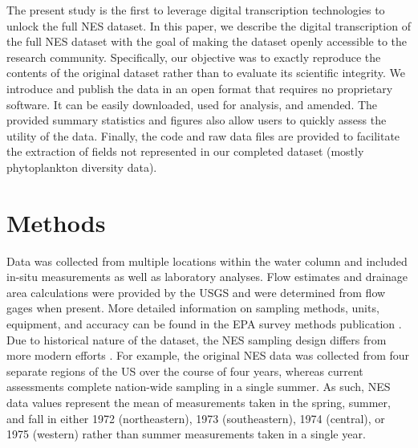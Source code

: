 \documentclass[journal abbreviations, manuscript]{copernicus}
\begin{document}
The present study is the first to leverage digital transcription technologies to unlock the full NES dataset. In this paper, we describe the digital transcription of the full NES dataset with the goal of making the dataset openly accessible to the research community. Specifically, our objective was to exactly reproduce the contents of the original dataset rather than to evaluate its scientific integrity. We introduce and publish the data in an open format that requires no proprietary software. It can be easily downloaded, used for analysis, and amended. The provided summary statistics and figures also allow users to quickly assess the utility of the data. Finally, the code and raw data files are provided to facilitate the extraction of fields not represented in our completed dataset (mostly phytoplankton diversity data).

\section{Methods}

Data was collected from multiple locations within the water column and included in-situ measurements as well as laboratory analyses. Flow estimates and drainage area calculations were provided by the USGS and were determined from flow gages when present. More detailed information on sampling methods, units, equipment, and accuracy can be found in the EPA survey methods publication \citep{nes-methods}. Due to historical nature of the dataset, the NES sampling design differs from more modern efforts \citep{nla-methods}. For example, the original NES data was collected from four separate regions of the US over the course of four years, whereas current assessments complete nation-wide sampling in a single summer. As such, NES data values represent the mean of measurements taken in the spring, summer, and fall in either 1972 (northeastern), 1973 (southeastern), 1974 (central), or 1975 (western) rather than summer measurements taken in a single year.
\end{document}
